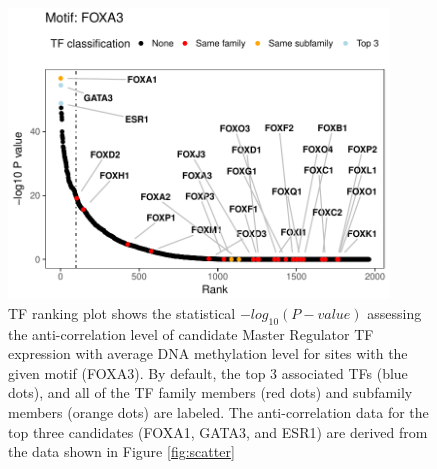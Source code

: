 \begin{landscape}

\begin{table}
\centering
\small
{}
\caption[Identification of master regulator Transcription Factors (TF) for each enriched motif] {First twenty rows of  the \textit{getTF.hypo.significant.TFs.with.motif.summary.csv} file created by \textit{get.Tfs} function (suffix "\_HUMAN.H11MO" was removed from motifs names). First column shows the enriched motif, "top\_5percent\_TFs" shows the top 5\% TFs ranked (the same as all TFs to the left of the dashed line in figure \ref{fig:tfplot}), "potential.TFs.family" are the TF from the "top\_5percent"  that belongs to the same family as the TF of the motif, "top.potential.TFs.family" is the highest ranked TF belonging to the same family as the TF of the motif (same as the first TF from "potential.TFs.family" column). The columns "potential.TFs.subfamily" and "top.potential.TFs.subfamily" are the same as "potential.TFs.family" and "top.potential.TFs.family"  but considering the subfamily classification instead. For example, the motif ANDR has two TFs in the top 5\% that belongs to the same TF family (Steroid hormone receptors): ESR1 and AR, but if considering subfamilies only AR in considered.
}
\label{tab:get.tf}
\end{table}
\end{landscape}


\begin{figure}
\centering
\includegraphics[width=0.9\textwidth]{images/TFranking.pdf}
\caption{\label{fig:tfplot} TF ranking plot shows the statistical $-log_{10}(P-value)$ assessing the anti-correlation level of candidate Master Regulator TF expression with average DNA methylation level for sites with the given motif (FOXA3). By default, the top 3 associated TFs (blue dots), and all of the TF family members (red dots) and subfamily members (orange dots) are labeled. The anti-correlation data for the top three candidates (FOXA1, GATA3, and ESR1) are derived from the data shown in Figure \ref{fig:scatter}}
\end{figure}

